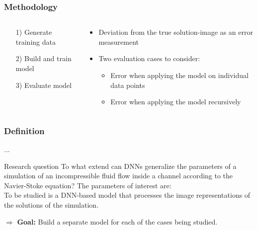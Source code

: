 \documentclass[18pt]{beamer}
\newcommand{\semitransp}[2][35]{\color{fg!#1}#2 \color{fg}}
\begin{document}
\begin{frame}[t]
  \frametitle{Methodology}
  \begin{columns}[t]
    \begin{column}{0.4\textwidth}
      \begin{itemize}
      \item[1)] \semitransp{Generate training data}
      \item[2)] \semitransp{Build and train model}
      \item[3)] Evaluate model
      \end{itemize}
    \end{column}
    \begin{column}{0.6\textwidth}
      \begin{itemize}
      \item Deviation from the true solution-image as an error measurement
      \item Two evaluation cases to consider:
        \begin{itemize}
        \item Error when applying the model on individual data points
        \item Error when applying the model recursively
        \end{itemize}
      \end{itemize}      
    \end{column}
  \end{columns}
\end{frame}


\begin{frame}[t]
  \frametitle{Definition}
  ...
  \begin{block}{Research question}
    To what extend can DNNs generalize the parameters of a simulation of an incompressible fluid flow inside a channel according to the Navier-Stoke equation? The parameters of interest are:
    \\
    To be studied is a DNN-based model that processes the image representations of the solutions of the simulation.
  \end{block}
  \pause
  $\Longrightarrow$ \textbf{Goal:} Build a separate model for each of the cases being studied.
\end{frame}
\end{document}
